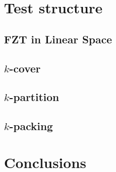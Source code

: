 \documentclass[a4paper, titlepage]{article}
\begin{document}
\section{Test structure}

\subsection{FZT in Linear Space}

\subsection{$k$-cover}

\subsection{$k$-partition}

\subsection{$k$-packing}

\section{Conclusions}
\end{document}
